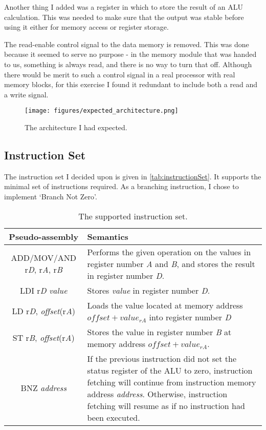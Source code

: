 \documentclass[11pt]{article}
\begin{document}
Another thing I added was a register in which to store the result of
an ALU calculation. This was needed to make sure that the output was
stable before using it either for memory access or register storage.

The read-enable control signal to the data memory is removed. This was
done because it seemed to serve no purpose - in the memory module that
was handed to us, something is always read, and there is no way to
turn that off. Although there would be merit to such a control signal
in a real processor with real memory blocks, for this exercise I found
it redundant to include both a read and a write signal.

\begin{figure}[ht]
  \centering
  \texttt{[image: figures/expected\_architecture.png]}
  \caption{\label{fig:expectedArchitecture} The architecture I had expected.}
\end{figure}


\subsection{Instruction Set}
\label{subsec:instructionSet}
The instruction set I decided upon is given in
\autoref{tab:instructionSet}. It supports the minimal set of
instructions required. As a branching instruction, I chose to
implement `Branch Not Zero'. 

\begin{table}[htbp]
  \centering
  \begin{tabular}{|c|p{190pt}|}
    \hline
    {\bf Pseudo-assembly} & {\bf Semantics} \\ \hline
    ADD/MOV/AND r{\em D}, r{\em A}, r{\em B} &  Performs the given operation on the values in register number {\em A} and {\em B}, and stores the result in register number {\em D}. \\ \hline
    LDI r{\em D} {\em value} & Stores {\em value} in register number {\em D}. \\ \hline
    LD r{\em D}, {\em offset}(r{\em A}) & Loads the value located at memory address $offset + value_{rA}$ into register number {\em D} \\ \hline
    ST r{\em B}, {\em offset}(r{\em A}) & Stores the value in register number {\em B} at memory address $offset + value_{rA}$. \\ \hline
    BNZ {\em address} & If the previous instruction did not set the status register of the ALU to zero, instruction fetching will continue from instruction memory address {\em address}. Otherwise, instruction fetching will resume as if no instruction had been executed. \\ \hline
  \end{tabular}
  \caption{The supported instruction set.}
  \label{tab:instructionSet}
\end{table}
\end{document}
